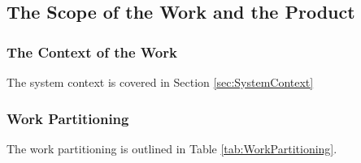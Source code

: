 \documentclass[12pt]{article}
\begin{document}
\subsection{The Scope of the Work and the Product}

\subsubsection{The Context of the Work}

The system context is covered in Section \ref{sec:SystemContext}

\subsubsection{Work Partitioning}

The work partitioning is outlined in Table \ref{tab:WorkPartitioning}.
\end{document}
